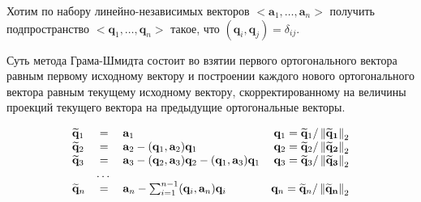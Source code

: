 Хотим по набору линейно-независимых векторов $<\mathbf{a}_1,\ldots,\mathbf{a}_n>$ получить
подпространство $<\mathbf{q}_1,\ldots,\mathbf{q}_n>$ такое, что $(\mathbf{q}_i,\mathbf{q}_j)=\delta_{ij}$.

Суть метода Грама-Шмидта состоит во взятии первого ортогонального вектора
равным первому исходному вектору и построении каждого нового ортогонального
вектора равным текущему исходному вектору, скорректированному на величины
проекций текущего вектора на предыдущие ортогональные векторы.

\[
  \begin{array}{lclr}
    \widetilde{\mathbf{q}}_1 & =     & \mathbf{a}_1                                                                                   & \mathbf{q}_1=\widetilde{\mathbf{q}}_1/\left\lVert\mathbf{\widetilde{q}_1}\right\rVert_{2} \\
    \widetilde{\mathbf{q}}_2 & =     & \mathbf{a}_2-(\mathbf{q}_1, \mathbf{a}_2)\mathbf{q}_1                                          & \mathbf{q}_2=\widetilde{\mathbf{q}}_2/\left\lVert\mathbf{\widetilde{q}_2}\right\rVert_{2} \\
    \widetilde{\mathbf{q}}_3 & =     & \mathbf{a}_3-(\mathbf{q}_2, \mathbf{a}_3)\mathbf{q}_2-(\mathbf{q}_1, \mathbf{a}_3)\mathbf{q}_1 & \mathbf{q}_3=\widetilde{\mathbf{q}}_3/\left\lVert\mathbf{\widetilde{q}_3}\right\rVert_{2} \\
                             & \dots &                                                                                                &                                                                  \\
    \widetilde{\mathbf{q}}_n & =     & \mathbf{a}_n-\sum_{i=1}^{n-1}(\mathbf{q}_i, \mathbf{a}_n)\mathbf{q}_i                          & \mathbf{q}_n=\widetilde{\mathbf{q}}_n/\left\lVert\mathbf{\widetilde{q}_n}\right\rVert_{2}
  \end{array}
\]

